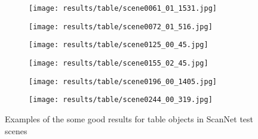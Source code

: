 \begin{figure}[h!]
  \centering
  \begin{subfigure}[b]{0.32\linewidth}
    \texttt{[image: results/table/scene0061\_01\_1531.jpg]}
  \end{subfigure}
  \begin{subfigure}[b]{0.32\linewidth}
    \texttt{[image: results/table/scene0072\_01\_516.jpg]}
  \end{subfigure}
  \begin{subfigure}[b]{0.32\linewidth}
    \texttt{[image: results/table/scene0125\_00\_45.jpg]}
  \end{subfigure}
  \begin{subfigure}[b]{0.32\linewidth}
    \texttt{[image: results/table/scene0155\_02\_45.jpg]}
  \end{subfigure}
  \begin{subfigure}[b]{0.32\linewidth}
    \texttt{[image: results/table/scene0196\_00\_1405.jpg]}
  \end{subfigure}
  \begin{subfigure}[b]{0.32\linewidth}
    \texttt{[image: results/table/scene0244\_00\_319.jpg]}
  \end{subfigure}
  \caption{Examples of the some good results for table objects in ScanNet test scenes}
  \label{fig:result_table}
\end{figure}

